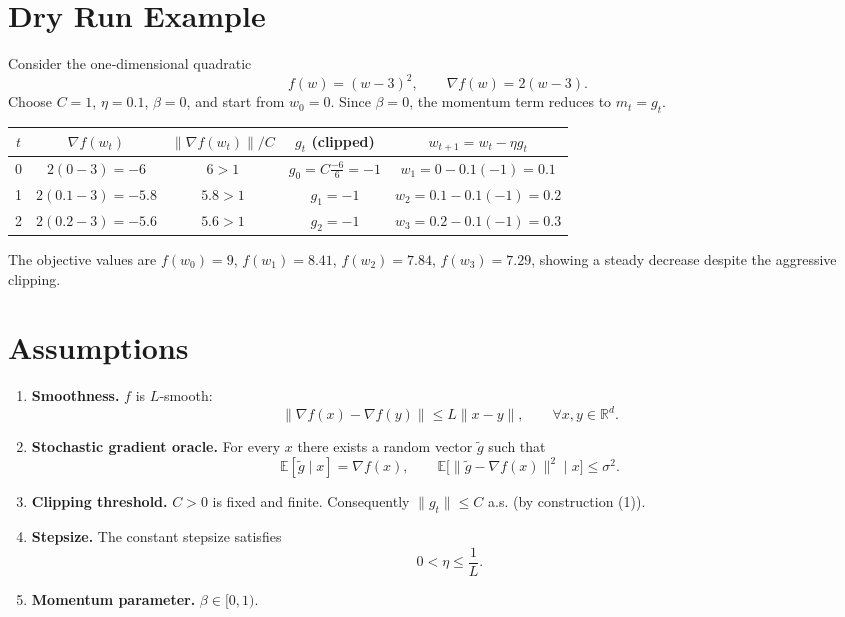 \documentclass{article}
\newcommand{\EE}{\mathbb{E}}
\newcommand{\R}{\mathbb{R}}
\begin{document}
\section*{Dry Run Example}
Consider the one‑dimensional quadratic
\[
f(w)=(w-3)^{2},\qquad \nabla f(w)=2(w-3).
\]
Choose $C=1$, $\eta=0.1$, $\beta=0$, and start from $w_{0}=0$.  
Since $\beta=0$, the momentum term reduces to $m_t=g_t$.

\begin{center}
\begin{tabular}{c|c|c|c|c}
$t$ & $\nabla f(w_t)$ & $\| \nabla f(w_t)\|/C$ & $g_t$ (clipped) & $w_{t+1}=w_t-\eta g_t$\\\hline
0 & $2(0-3)=-6$ & $6>1$ & $g_0= C\frac{-6}{6}= -1$ & $w_1=0-0.1(-1)=0.1$\\[4pt]
1 & $2(0.1-3)=-5.8$ & $5.8>1$ & $g_1=-1$ & $w_2=0.1-0.1(-1)=0.2$\\[4pt]
2 & $2(0.2-3)=-5.6$ & $5.6>1$ & $g_2=-1$ & $w_3=0.2-0.1(-1)=0.3$
\end{tabular}
\end{center}

The objective values are
$f(w_0)=9$, $f(w_1)=8.41$, $f(w_2)=7.84$, $f(w_3)=7.29$,
showing a steady decrease despite the aggressive clipping.

\section*{Assumptions}
\begin{enumerate}
\item \textbf{Smoothness.} $f$ is $L$‑smooth:
\[
\|\nabla f(x)-\nabla f(y)\|\le L\|x-y\|,\qquad\forall x,y\in\R^{d}.
\tag{A1}
\]

\item \textbf{Stochastic gradient oracle.}
For every $x$ there exists a random vector $\tilde g$ such that
\[
\EE[\tilde g\mid x]=\nabla f(x),\qquad
\EE\big[\|\tilde g-\nabla f(x)\|^{2}\mid x\big]\le\sigma^{2}.
\tag{A2}
\]

\item \textbf{Clipping threshold.} $C>0$ is fixed and finite.
Consequently $\|g_t\|\le C$ a.s. (by construction (1)). 
\]

\item \textbf{Stepsize.} The constant stepsize satisfies
\[
0<\eta\le\frac{1}{L}.
\tag{A4}
\]

\item \textbf{Momentum parameter.} $\beta\in[0,1)$.
\end{enumerate}
\end{document}
